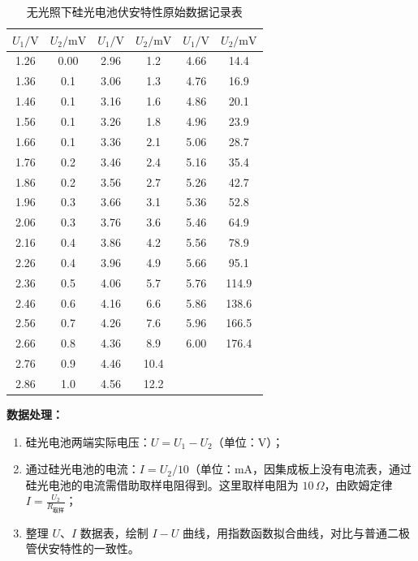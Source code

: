 \documentclass[11pt]{article}
\begin{document}
\begin{table}[htbp]
    \centering
    \caption{无光照下硅光电池伏安特性原始数据记录表}
    \label{tab:dark_raw}
    \begin{tabular}{cc|cc|cc}
        \toprule
        $U_1 / \text{V}$ & $U_2 / \text{mV}$ & $U_1 / \text{V}$ & $U_2 / \text{mV}$ & $U_1 / \text{V}$ & $U_2 / \text{mV}$ \\
        \midrule
        1.26 & 0.00 & 2.96 & 1.2  & 4.66 & 14.4  \\
        1.36 & 0.1  & 3.06 & 1.3  & 4.76 & 16.9  \\
        1.46 & 0.1  & 3.16 & 1.6  & 4.86 & 20.1  \\
        1.56 & 0.1  & 3.26 & 1.8  & 4.96 & 23.9  \\
        1.66 & 0.1  & 3.36 & 2.1  & 5.06 & 28.7  \\
        1.76 & 0.2  & 3.46 & 2.4  & 5.16 & 35.4  \\
        1.86 & 0.2  & 3.56 & 2.7  & 5.26 & 42.7  \\
        1.96 & 0.3  & 3.66 & 3.1  & 5.36 & 52.8  \\
        2.06 & 0.3  & 3.76 & 3.6  & 5.46 & 64.9  \\
        2.16 & 0.4  & 3.86 & 4.2  & 5.56 & 78.9  \\
        2.26 & 0.4  & 3.96 & 4.9  & 5.66 & 95.1  \\
        2.36 & 0.5  & 4.06 & 5.7  & 5.76 & 114.9 \\
        2.46 & 0.6  & 4.16 & 6.6  & 5.86 & 138.6 \\
        2.56 & 0.7  & 4.26 & 7.6  & 5.96 & 166.5 \\
        2.66 & 0.8  & 4.36 & 8.9  & 6.00 & 176.4 \\
        2.76 & 0.9  & 4.46 & 10.4 &      &       \\
        2.86 & 1.0  & 4.56 & 12.2 &      &       \\
        \bottomrule
    \end{tabular}
\end{table}

\textbf{数据处理：}
\begin{enumerate}
    \item[(1)] 硅光电池两端实际电压：$U = U_1 - U_2$（单位：$\text{V}$）；
    \item[(2)] 通过硅光电池的电流：$I = U_2/10$（单位：$\text{mA}$，因集成板上没有电流表，通过硅光电池的电流需借助取样电阻得到。这里取样电阻为 $10\,\Omega$，由欧姆定律 $I = \frac{U_2}{R_{\text{取样}}}$；
    \item[(3)] 整理 $U$、$I$ 数据表，绘制 $I-U$ 曲线，用指数函数拟合曲线，对比与普通二极管伏安特性的一致性。
\end{enumerate}
\end{document}
